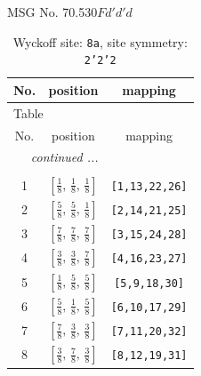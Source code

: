 \documentclass[fleqn,8pt]{jsarticle}
\begin{document}
\setcounter{MaxMatrixCols}{32}

\renewcommand{\tablename}{Table~}
\renewcommand{\figurename}{Figure~}
\begin{center}
\LARGE
MSG No. 70.530\quad$Fd'd'd$
\end{center}
\renewcommand{\arraystretch}{1.2}
\begin{longtable}{ccc}
\caption{Wyckoff site: {\tt 8a}, site symmetry: {\tt 2'2'2}}
 \\
 \hline \hline
No. & position & mapping \\ \hline \endfirsthead

\multicolumn{2}{l}{\tablename\ \thetable{}} \\
 \hline \hline
No. & position & mapping \\ \hline \endhead

 \hline \hline
\multicolumn{2}{r}{\footnotesize\it continued ...} \\ \endfoot

 \hline \hline
\multicolumn{2}{r}{} \\ \endlastfoot

1 & $\left[ \frac{1}{8},\, \frac{1}{8},\, \frac{1}{8} \right]$ & {\tt [1,13,22,26]} \\ \hline
2 & $\left[ \frac{5}{8},\, \frac{5}{8},\, \frac{1}{8} \right]$ & {\tt [2,14,21,25]} \\ \hline
3 & $\left[ \frac{7}{8},\, \frac{7}{8},\, \frac{7}{8} \right]$ & {\tt [3,15,24,28]} \\ \hline
4 & $\left[ \frac{3}{8},\, \frac{3}{8},\, \frac{7}{8} \right]$ & {\tt [4,16,23,27]} \\ \hline
5 & $\left[ \frac{1}{8},\, \frac{5}{8},\, \frac{5}{8} \right]$ & {\tt [5,9,18,30]} \\ \hline
6 & $\left[ \frac{5}{8},\, \frac{1}{8},\, \frac{5}{8} \right]$ & {\tt [6,10,17,29]} \\ \hline
7 & $\left[ \frac{7}{8},\, \frac{3}{8},\, \frac{3}{8} \right]$ & {\tt [7,11,20,32]} \\ \hline
8 & $\left[ \frac{3}{8},\, \frac{7}{8},\, \frac{3}{8} \right]$ & {\tt [8,12,19,31]} \\
\end{longtable}
\renewcommand{\arraystretch}{1.2}
\end{document}
